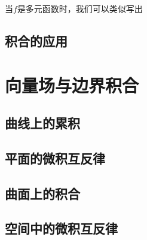 \documentclass[12pt,UTF8]{ctexbook}
\begin{document}
当$f$是多元函数时，我们可以类似写出


\section{积合的应用}

\chapter{向量场与边界积合}

\section{曲线上的累积}

\section{平面的微积互反律}

\section{曲面上的积合}

\section{空间中的微积互反律}
\end{document}
